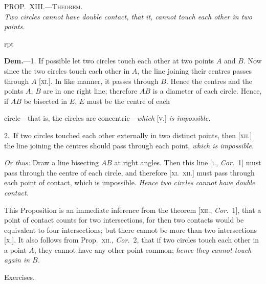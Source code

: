 \documentclass[oneside]{book}
\newcounter{wrapwidth}
\newcommand\myprop[2]{
\bigskip\Needspace*{4\baselineskip}\begin{center}\textsc{#1}\\\medskip\emph{#2}\par\end{center}
}
\newcommand\exhead[1]{
\Needspace*{5\baselineskip}\begin{center}
\textsf{#1}
\end{center}
}
\newcommand\imgflow[3]{
\setcounter{wrapwidth}{#1}

\begin{wrapfigure}[#2]{r}{\value{wrapwidth}pt}
\begin{center}
\vspace{-0.3in}

\end{center}
\end{wrapfigure}
}
\begin{document}
\myprop{PROP\@.~XIII\@.---Theorem.}{Two circles cannot have double contact, that it, cannot
touch each other in two points.}


\imgflow{120}{9}{f118}

\textbf{Dem.}---1. If possible let two circles touch each
other at two points $A$ and $B$.
Now since the two circles touch
each other in $A$, the line joining
their centres passes through $A$
[\textsc{xi.}]. In like manner, it passes
through $B$. Hence the centres
and the points $A$, $B$ are in one
right line; therefore $AB$ is a
diameter of each circle. Hence,
if $AB$ be bisected in $E$, $E$ must be the centre of each

circle---that is, the circles are concentric---\emph{which} [\textsc{v.}] \emph{is
impossible.}

2.~If two circles touched each other externally in
two distinct points, then [\textsc{xii.}] the line joining the
centres should pass through each point, \emph{which is impossible.}

\emph{Or thus:} Draw a line bisecting $AB$ at right angles.
Then this line [\textsc{i.}, \emph{Cor.}~1]\label{Icor1} must pass through the centre
of each circle, and therefore [\textsc{xi.~xii.}] must pass through
each point of contact, which is impossible. \emph{Hence two
circles cannot have double contact.}\par\medskip

\begin{footnotesize}
This Proposition is an immediate inference from the theorem
[\textsc{xii.}, \emph{Cor.}~1], that a point of contact counts for two intersections,
for then two contacts would be equivalent to four intersections;
but there cannot be more than two intersections [\textsc{x.}]. It also
follows from Prop.~\textsc{xii.}, \emph{Cor.}~2, that if two circles touch each
other in a point $A$, they cannot have any other point common;
\emph{hence they cannot touch again in $B$.}
\par\end{footnotesize}

\exhead{Exercises.}
\end{document}
